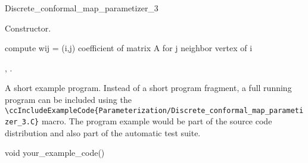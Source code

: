 \begin{ccRefClass}{Discrete_conformal_map_parametizer_3}
\ccCreation
{}  %

{
Constructor.
}


\ccOperations

{
compute wij = (i,j) coefficient of matrix A for j neighbor vertex of i
}


\ccSeeAlso

,
.

\ccExample

A short example program.
Instead of a short program fragment, a full running program can be
included using the 
\verb|\ccIncludeExampleCode{Parameterization/Discrete_conformal_map_parametizer_3.C}| 
macro. The program example would be part of the source code distribution and
also part of the automatic test suite.

\begin{ccExampleCode}
void your_example_code() {
}
\end{ccExampleCode}


\end{ccRefClass}


